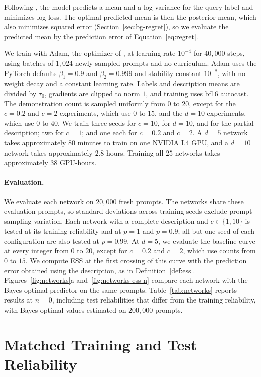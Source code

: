 Following \citet{zhu2026}, the model predicts a mean and a log variance for the query label and minimizes log loss. The optimal predicted mean is then the posterior mean, which also minimizes squared error (Section~\ref{sec:bg-regret}), so we evaluate the predicted mean by the prediction error of Equation~\eqref{eq:regret}.

We train with Adam, the optimizer of \citet{garg2022}, at learning rate $10^{-4}$ for $40{,}000$ steps, using batches of $1{,}024$ newly sampled prompts and no curriculum. Adam uses the PyTorch defaults $\beta_1 = 0.9$ and $\beta_2 = 0.999$ and stability constant $10^{-8}$, with no weight decay and a constant learning rate. Labels and description means are divided by $\tau_0$, gradients are clipped to norm $1$, and training uses bf16 autocast. The demonstration count is sampled uniformly from $0$ to $20$, except for the $c = 0.2$ and $c = 2$ experiments, which use $0$ to $15$, and the $d = 10$ experiments, which use $0$ to $40$. We train three seeds for $c = 10$, for $d = 10$, and for the partial description; two for $c = 1$; and one each for $c = 0.2$ and $c = 2$. A $d = 5$ network takes approximately $80$ minutes to train on one NVIDIA L4 GPU, and a $d = 10$ network takes approximately $2.8$ hours. Training all $25$ networks takes approximately $38$ GPU-hours.

\paragraph{Evaluation.}
We evaluate each network on $20{,}000$ fresh prompts. The networks share these evaluation prompts, so standard deviations across training seeds exclude prompt-sampling variation. Each network with a complete description and $c \in \{1, 10\}$ is tested at its training reliability and at $p = 1$ and $p = 0.9$; all but one seed of each configuration are also tested at $p = 0.99$. At $d = 5$, we evaluate the baseline curve at every integer from $0$ to $20$, except for $c = 0.2$ and $c = 2$, which use counts from $0$ to $15$. We compute ESS at the first crossing of this curve with the prediction error obtained using the description, as in Definition~\ref{def:ess}. Figures~\ref{fig:networks}a and~\ref{fig:networks-ess-n} compare each network with the Bayes-optimal predictor on the same prompts. Table~\ref{tab:networks} reports results at $n = 0$, including test reliabilities that differ from the training reliability, with Bayes-optimal values estimated on $200{,}000$ prompts.

\section{Matched Training and Test Reliability}\label{sec:networks-matched}

